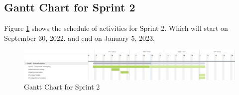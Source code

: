 \subsection{Gantt Chart for Sprint 2}
\label{subsec:gantt_chart_sprint2}
Figure \ref{fig:gantt_chart_sprint2} shows the schedule of activities 
for Sprint 2. Which will start on September 30, 2022, and end on January 5, 2023.
\begin{figure}[ht]
    \centering
    \includegraphics[width=1\textwidth]{./assets/Chapter_3/Gantt/Gantt_Chart_Sprint2.png}
    \caption{Gantt Chart for Sprint 2}
    \label{fig:gantt_chart_sprint2}
\end{figure}
\FloatBarrier